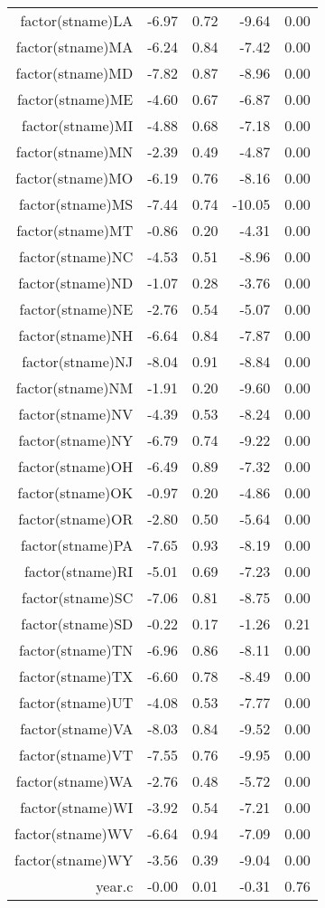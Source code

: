 \begin{table}[ht]
\begin{tabular}{rrrrr}
  factor(stname)LA & -6.97 & 0.72 & -9.64 & 0.00 \\ 
  factor(stname)MA & -6.24 & 0.84 & -7.42 & 0.00 \\ 
  factor(stname)MD & -7.82 & 0.87 & -8.96 & 0.00 \\ 
  factor(stname)ME & -4.60 & 0.67 & -6.87 & 0.00 \\ 
  factor(stname)MI & -4.88 & 0.68 & -7.18 & 0.00 \\ 
  factor(stname)MN & -2.39 & 0.49 & -4.87 & 0.00 \\ 
  factor(stname)MO & -6.19 & 0.76 & -8.16 & 0.00 \\ 
  factor(stname)MS & -7.44 & 0.74 & -10.05 & 0.00 \\ 
  factor(stname)MT & -0.86 & 0.20 & -4.31 & 0.00 \\ 
  factor(stname)NC & -4.53 & 0.51 & -8.96 & 0.00 \\ 
  factor(stname)ND & -1.07 & 0.28 & -3.76 & 0.00 \\ 
  factor(stname)NE & -2.76 & 0.54 & -5.07 & 0.00 \\ 
  factor(stname)NH & -6.64 & 0.84 & -7.87 & 0.00 \\ 
  factor(stname)NJ & -8.04 & 0.91 & -8.84 & 0.00 \\ 
  factor(stname)NM & -1.91 & 0.20 & -9.60 & 0.00 \\ 
  factor(stname)NV & -4.39 & 0.53 & -8.24 & 0.00 \\ 
  factor(stname)NY & -6.79 & 0.74 & -9.22 & 0.00 \\ 
  factor(stname)OH & -6.49 & 0.89 & -7.32 & 0.00 \\ 
  factor(stname)OK & -0.97 & 0.20 & -4.86 & 0.00 \\ 
  factor(stname)OR & -2.80 & 0.50 & -5.64 & 0.00 \\ 
  factor(stname)PA & -7.65 & 0.93 & -8.19 & 0.00 \\ 
  factor(stname)RI & -5.01 & 0.69 & -7.23 & 0.00 \\ 
  factor(stname)SC & -7.06 & 0.81 & -8.75 & 0.00 \\ 
  factor(stname)SD & -0.22 & 0.17 & -1.26 & 0.21 \\ 
  factor(stname)TN & -6.96 & 0.86 & -8.11 & 0.00 \\ 
  factor(stname)TX & -6.60 & 0.78 & -8.49 & 0.00 \\ 
  factor(stname)UT & -4.08 & 0.53 & -7.77 & 0.00 \\ 
  factor(stname)VA & -8.03 & 0.84 & -9.52 & 0.00 \\ 
  factor(stname)VT & -7.55 & 0.76 & -9.95 & 0.00 \\ 
  factor(stname)WA & -2.76 & 0.48 & -5.72 & 0.00 \\ 
  factor(stname)WI & -3.92 & 0.54 & -7.21 & 0.00 \\ 
  factor(stname)WV & -6.64 & 0.94 & -7.09 & 0.00 \\ 
  factor(stname)WY & -3.56 & 0.39 & -9.04 & 0.00 \\ 
  year.c & -0.00 & 0.01 & -0.31 & 0.76 \\ 
   \hline
\end{tabular}
\end{table}
